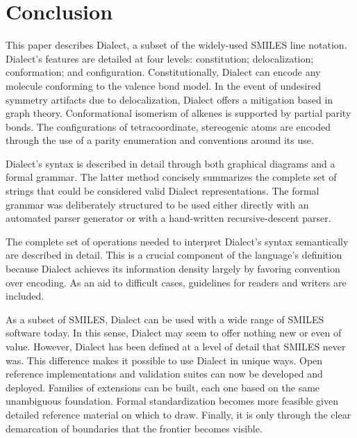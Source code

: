 \documentclass{article}
\begin{document}
\section*{Conclusion}

This paper describes Dialect, a subset of the widely-\-used SMILES line notation. Dialect's features are detailed at four levels: constitution; delocalization; conformation; and configuration. Constitutionally, Dialect can encode any molecule conforming to the valence bond model. In the event of undesired symmetry artifacts due to delocalization, Dialect offers a mitigation based in graph theory. Conformational isomerism of alkenes is supported by partial parity bonds. The configurations of tetracoordinate, stereogenic atoms are encoded through the use of a parity enumeration and conventions around its use.

Dialect's syntax is described in detail through both graphical diagrams and a formal grammar. The latter method concisely summarizes the complete set of strings that could be considered valid Dialect representations. The formal grammar was deliberately structured to be used either directly with an automated parser generator or with a hand-written recursive-descent parser.

The complete set of operations needed to interpret Dialect's syntax semantically are described in detail. This is a crucial component of the language's definition because Dialect achieves its information density largely by favoring convention over encoding. As an aid to difficult cases, guidelines for readers and writers are included.

As a subset of SMILES, Dialect can be used with a wide range of SMILES software today. In this sense, Dialect may seem to offer nothing new or even of value. However, Dialect has been defined at a level of detail that SMILES never was. This difference makes it possible to use Dialect in unique ways. Open reference implementations and validation suites can now be developed and deployed. Families of extensions can be built, each one based on the same unambiguous foundation. Formal standardization becomes more feasible given detailed reference material on which to draw. Finally, it is only through the clear demarcation of boundaries that the frontier becomes visible.

\clearpage
\printbibliography
\end{document}
